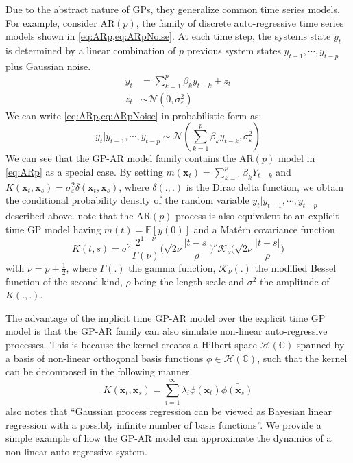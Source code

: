 Due to the abstract nature of GPs, they generalize common time series models. For example, consider 
$\mathrm{AR}(p)$, the family of discrete auto-regressive time series models shown in \cref{eq:ARp,eq:ARpNoise}. 
At each time step, the systems state $y_t$ is determined by a linear combination of $p$ previous system states 
$y_{t-1}, \cdots, y_{t-p}$ plus Gaussian noise.  
%
\begin{align}
    y_t &= \sum^{p}_{k = 1}{\beta_{k}y_{t-k}} + z_t \label{eq:ARp} \\
    z_t &\sim \mathcal{N}(0, \sigma^{2}_{\varepsilon})\label{eq:ARpNoise}
\end{align}
%
We can write \cref{eq:ARp,eq:ARpNoise} in probabilistic form as: 
\begin{equation*}
    y_t \rvert y_{t-1}, \cdots, y_{t-p} \sim \mathcal{N}(\sum^{p}_{k = 1}{\beta_{k}y_{t-k}}, \sigma^{2}_{\varepsilon})
\end{equation*}
%
We can see that the GP-AR model family contains the $\mathrm{AR}(p)$ model in \cref{eq:ARp} as a special case. 
By setting $m(\mathbf{x}_t) = \sum^{p}_{k = 1}{\beta_{k}Y_{t-k}}$ and 
$K(\mathbf{x}_t, \mathbf{x}_s) = \sigma^2_{\varepsilon}\delta(\mathbf{x}_t, \mathbf{x}_s)$, where $\delta(.,.)$ 
is the Dirac delta function, we obtain the conditional probability density of the random variable 
$y_t \rvert y_{t-1}, \cdots, y_{t-p}$ described above. \cite{roberts2013gaussian} note that the $\mathrm{AR}(p)$ 
process is also equivalent to an explicit time GP model having $m(t) = \mathbb{E}[y(0)]$ and a Mat\'{e}rn 
covariance function
%
\begin{equation*}
    K(t, s)=\sigma ^{2}{\frac {2^{1-\nu }}{\Gamma (\nu )}}
    {\Bigg (}
        {\sqrt {2\nu }}{\frac {\rvert t - s \rvert}{\rho }}
    {\Bigg )}^{\nu }\mathcal{K}_{\nu }{\Bigg (}{\sqrt {2\nu }}{\frac {\rvert t - s \rvert}{\rho }}{\Bigg )}
\end{equation*}
%
with $\nu = p + \frac{1}{2}$, where $\Gamma(.)$ the gamma function, $\mathcal{K}_{\nu }(.)$ the modified 
Bessel function of the second kind, $\rho$ being the length scale and $\sigma^2$ the amplitude of $K(.,.)$.

The advantage of the implicit time GP-AR model over the explicit time GP model is that the GP-AR family 
can also simulate non-linear auto-regressive processes. This is because the kernel creates a Hilbert space 
$\mathcal{H}(\mathbb{C})$ spanned by a basis of non-linear orthogonal basis functions 
$\phi \in \mathcal{H}(\mathbb{C})$, such that the kernel can be decomposed 
\citep[sec.~4.3]{Rasmussen:2005:GPM:1162254} in the following manner.
%
\begin{equation*}
    K(\mathbf{x}_t, \mathbf{x}_s) = \sum^{\infty}_{i = 1}{\lambda_{i}\phi(\mathbf{x}_t) \bar{\phi(\mathbf{x}_s)}}
\end{equation*}
%
\citet[ch.~2]{Rasmussen:2005:GPM:1162254} also notes that \enquote{Gaussian process regression can be viewed as Bayesian linear regression with a possibly infinite number of basis functions}. We provide a simple example of how the GP-AR 
model can approximate the dynamics of a non-linear auto-regressive system.

